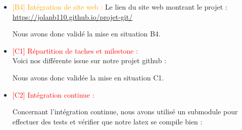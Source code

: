 \begin{itemize}
    \item \textcolor{orange}{[B4] Intégration de site web : }
    Le lien du site web montrant le projet : \url{https://jolanb110.github.io/projet-git/}

    Nous avons donc validé la mise en situation B4.
    \item \textcolor{red}{[C1] Répartition de taches et milestone : }
    \\Voici nos différente issue sur notre projet github :


    Nous avons donc validée la mise en situation C1.
    
    \item \textcolor{red}{[C2] Intégration continue : }

    Concernant l'intégration continue, nous avons utilisé un submodule pour effectuer des tests et vérifier que notre latex se compile bien : 




\end{itemize}
